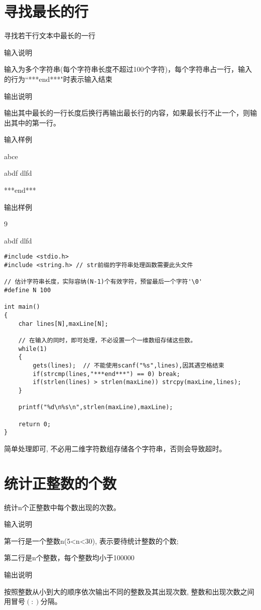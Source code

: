 \section{寻找最长的行}	
寻找若干行文本中最长的一行

输入说明	

输入为多个字符串(每个字符串长度不超过100个字符)，每个字符串占一行，输入的行为``***end***"时表示输入结束

输出说明
	
输出其中最长的一行长度后换行再输出最长行的内容，如果最长行不止一个，则输出其中的第一行。

输入样例
	
abce

abdf dlfd

***end***

输出样例
	
9

abdf dlfd 

\begin{lstlisting}
#include <stdio.h>
#include <string.h> // str前缀的字符串处理函数需要此头文件 

// 估计字符串长度，实际容纳(N-1)个有效字符，预留最后一个字符'\0' 
#define N 100

int main()
{
	char lines[N],maxLine[N];
	
	// 在输入的同时，即可处理，不必设置一个一维数组存储这些数。
	while(1)
	{
		gets(lines);  // 不能使用scanf("%s",lines),因其遇空格结束 
		if(strcmp(lines,"***end***") == 0) break;
		if(strlen(lines) > strlen(maxLine)) strcpy(maxLine,lines);
	}
	
	printf("%d\n%s\n",strlen(maxLine),maxLine); 
	
	return 0;
} 
\end{lstlisting}

\begin{note}[要点]
	简单处理即可, 不必用二维字符数组存储各个字符串，否则会导致超时。
\end{note}

\section{统计正整数的个数}
统计n个正整数中每个数出现的次数。

输入说明	

第一行是一个整数n(5<n<30), 表示要待统计整数的个数;

第二行是n个整数，每个整数均小于100000

输出说明
	
按照整数从小到大的顺序依次输出不同的整数及其出现次数, 整数和出现次数之间用冒号$(:)$分隔。

